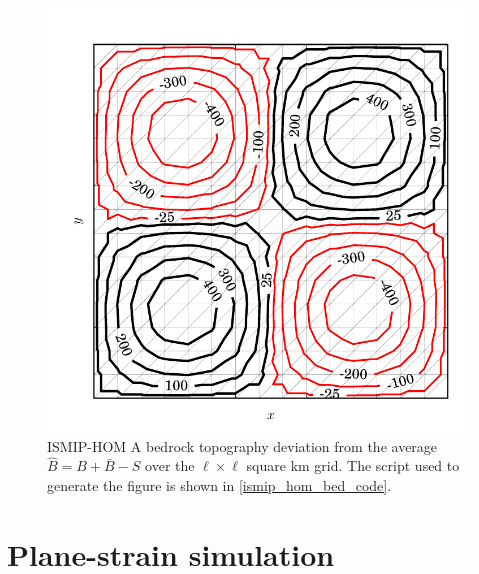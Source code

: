 \begin{figure}
  \centering
    \includegraphics[width=\linewidth]{images/momentum/ISMIP_HOM_A/B.pdf}
  \caption[ISMIP-HOM bedrock topography]{ISMIP-HOM A bedrock topography deviation from the average $\hat{B} = B + \bar{B} - S$ over the $\ell \times \ell$ square km grid.  The \CSLVR script used to generate the figure is shown in \cref{ismip_hom_bed_code}.}
  \label{ismip_hom_a_B}
\end{figure}




\section{Plane-strain simulation} \label{ssn_plane_strain_simulation}

